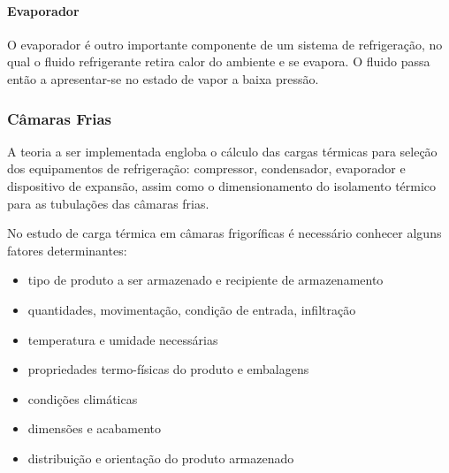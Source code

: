 \documentclass[10pt,a4paper]{article}
\begin{document}
\paragraph*{{ Evaporador}}
O evaporador é outro importante componente de um sistema de refrigeração, no qual o fluido refrigerante retira calor do ambiente e se evapora. O fluido passa então a apresentar-se no estado de vapor a baixa pressão. %




\subsubsection{{ Câmaras Frias}}

A teoria a ser implementada engloba o cálculo das cargas térmicas para seleção dos equipamentos de refrigeração: compressor, condensador, evaporador e dispositivo de expansão, assim como o dimensionamento do isolamento térmico para as tubulações das câmaras frias. 

No estudo de carga térmica em câmaras frigoríficas é necessário conhecer alguns fatores determinantes:
\begin{itemize}
    \item tipo de produto a ser armazenado e recipiente de armazenamento
    \item quantidades, movimentação, condição de entrada, infiltração
    \item temperatura e umidade necessárias
    \item propriedades termo-físicas do produto e embalagens
    \item condições climáticas
    \item dimensões e acabamento
    \item distribuição e orientação do produto armazenado
\end{itemize}
\end{document}
